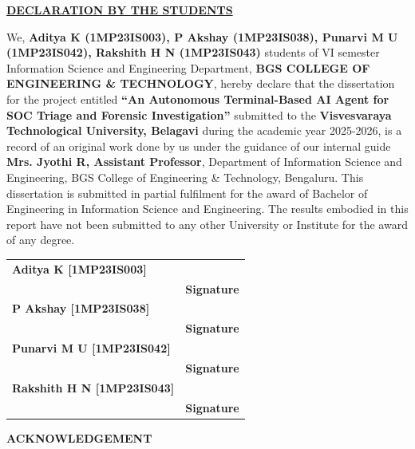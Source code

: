 \documentclass[12pt,a4paper]{report}
\begin{document}
\vspace{0.3cm}
\begin{center}
  \underline{\textbf{DECLARATION BY THE STUDENTS}}
\end{center}

\noindent
We, \textbf{Aditya K (1MP23IS003), P Akshay (1MP23IS038), Punarvi M U (1MP23IS042), Rakshith H N (1MP23IS043)} students of VI semester Information Science and Engineering Department, \textbf{BGS COLLEGE OF ENGINEERING \& TECHNOLOGY}, hereby declare that the dissertation for the project entitled \textbf{``An Autonomous Terminal-Based AI Agent for SOC Triage and Forensic Investigation''} submitted to the \textbf{Visvesvaraya Technological University, Belagavi} during the academic year 2025-2026, is a record of an original work done by us under the guidance of our internal guide \textbf{Mrs. Jyothi R, Assistant Professor}, Department of Information Science and Engineering, BGS College of Engineering \& Technology, Bengaluru. This dissertation is submitted in partial fulfilment for the award of Bachelor of Engineering in Information Science and Engineering. The results embodied in this report have not been submitted to any other University or Institute for the award of any degree.

\vspace{0.8cm}

\noindent
\begin{tabular}{@{}p{}@{}p{}@{}}
  \textbf{Aditya K [1MP23IS003]} & \underline{\hspace{3cm}} \\
  & \textbf{Signature} \\[0.8cm]
  \textbf{P Akshay [1MP23IS038]} & \underline{\hspace{3cm}} \\
  & \textbf{Signature} \\[0.8cm]
  \textbf{Punarvi M U [1MP23IS042]} & \underline{\hspace{3cm}} \\
  & \textbf{Signature} \\[0.8cm]
  \textbf{Rakshith H N [1MP23IS043]} & \underline{\hspace{3cm}} \\
  & \textbf{Signature} \\
\end{tabular}

\newpage
\begin{center}
  {\Large\bfseries ACKNOWLEDGEMENT}
\end{center}
\vspace{0.5cm}
\thispagestyle{empty}
\end{document}
